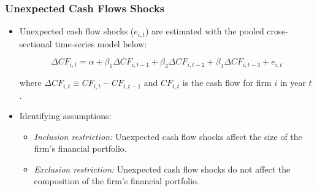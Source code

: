 \documentclass[handout]{beamer}
\begin{document}
\begin{frame}[label=unexpected]
\frametitle{Unexpected Cash Flows Shocks}
\begin{itemize}

\item Unexpected cash flow shocks ($e_{i,t}$) are estimated with the pooled cross-sectional time-series model below:

$$
\Delta CF_{i,t}
= \alpha + \beta_1 \Delta CF_{i,t-1} + \beta_2 \Delta CF_{i,t-2} + \beta_3 \Delta CF_{i,t-3} + e_{i,t}
$$

where $\Delta CF_{i,t} \equiv CF_{i,t} - CF_{i,t-1}$ and $CF_{i,t}$ is the cash flow for firm $i$ in year $t$.

\item Identifying assumptions:

\begin{itemize}

\item \textit{Inclusion restriction:} Unexpected cash flow shocks affect the size of the firm's financial portfolio.
\item \textit{Exclusion restriction:} Unexpected cash flow shocks do not affect the composition of the firm's financial portfolio.



\end{itemize}

\end{itemize}
\hyperlink{endogeneity}{}
\end{frame}
\end{document}

